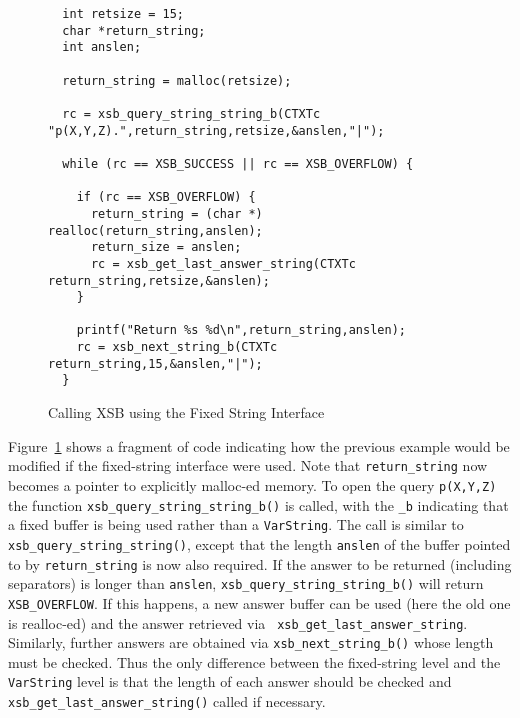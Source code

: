 \begin{figure}[hbtp]
\begin{small}
\begin{verbatim}
  int retsize = 15;
  char *return_string;
  int anslen;

  return_string = malloc(retsize);

  rc = xsb_query_string_string_b(CTXTc "p(X,Y,Z).",return_string,retsize,&anslen,"|");

  while (rc == XSB_SUCCESS || rc == XSB_OVERFLOW) {
  
    if (rc == XSB_OVERFLOW) {
      return_string = (char *) realloc(return_string,anslen);
      return_size = anslen;
      rc = xsb_get_last_answer_string(CTXTc return_string,retsize,&anslen);
    }    

    printf("Return %s %d\n",return_string,anslen);
    rc = xsb_next_string_b(CTXTc return_string,15,&anslen,"|");
  }
\end{verbatim}
\end{small}
\caption{Calling XSB using the Fixed String Interface} \label{fig:fixedstringex}
\end{figure}

Figure~\ref{fig:fixedstringex} shows a fragment of code indicating how
the previous example would be modified if the fixed-string interface
were used.  Note that {\tt return\_string} now becomes a pointer to
explicitly malloc-ed memory.  To open the query {\tt p(X,Y,Z)} the
function {\tt xsb\_query\_string\_string\_b()} is called, with the
{\tt \_b} indicating that a fixed buffer is being used rather than a
{\tt VarString}.  The call is similar to {\tt
  xsb\_query\_string\_string()}, except that the length {\tt anslen}
of the buffer pointed to by {\tt return\_string} is now also required.
If the answer to be returned (including separators) is longer than
{\tt anslen}, {\tt xsb\_query\_string\_string\_b()} will return {\tt
  XSB\_OVERFLOW}.  If this happens, a new answer buffer can be used
(here the old one is realloc-ed) and the answer retrieved via {\tt
  xsb\_get\_last\_answer\_string}.  Similarly, further answers are
obtained via {\tt xsb\_next\_string\_b()} whose length must be
checked.  Thus the only difference between the fixed-string level and
the {\tt VarString} level is that the length of each answer should be
checked and {\tt xsb\_get\_last\_answer\_string()} called if
necessary.

